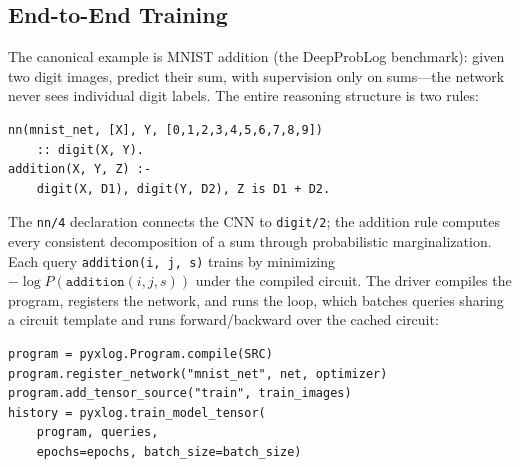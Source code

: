 \subsection{End-to-End Training}

The canonical example is MNIST addition (the DeepProbLog benchmark): given two digit images, predict their sum, with supervision only on sums---the network never sees individual digit labels. The entire reasoning structure is two rules:

\begin{lstlisting}[style=xlogstyle,
                   caption={MNIST addition: a CNN-backed digit predicate and an addition rule.},
                   label={lst:mnist-prog}]
nn(mnist_net, [X], Y, [0,1,2,3,4,5,6,7,8,9])
    :: digit(X, Y).
addition(X, Y, Z) :-
    digit(X, D1), digit(Y, D2), Z is D1 + D2.
\end{lstlisting}

The \texttt{nn/4} declaration connects the CNN to \texttt{digit/2}; the addition rule computes every consistent decomposition of a sum through probabilistic marginalization. Each query \texttt{addition(i, j, s)} trains by minimizing $-\log P(\texttt{addition}(i, j, s))$ under the compiled circuit. The driver compiles the program, registers the network, and runs the loop, which batches queries sharing a circuit template and runs forward/backward over the cached circuit:

\begin{lstlisting}[style=pythonstyle,
                   caption={Python driver: compile, register, train.},
                   label={lst:mnist-train}]
program = pyxlog.Program.compile(SRC)
program.register_network("mnist_net", net, optimizer)
program.add_tensor_source("train", train_images)
history = pyxlog.train_model_tensor(
    program, queries,
    epochs=epochs, batch_size=batch_size)
\end{lstlisting}


